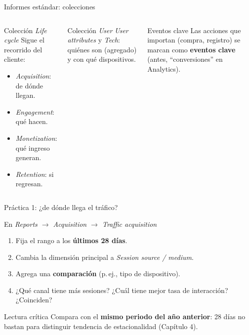 \documentclass[aspectratio=169,xcolor=dvipsnames]{beamer}
\begin{document}
\begin{frame}{Informes estándar: colecciones}
\begin{columns}[T]
  \begin{block}{Colección \textit{Life cycle}}
    \small Sigue el recorrido del cliente:
    \begin{itemize}
      \scriptsize
      \item \textit{Acquisition}: de dónde llegan.
      \item \textit{Engagement}: qué hacen.
      \item \textit{Monetization}: qué ingreso generan.
      \item \textit{Retention}: si regresan.
    \end{itemize}
  \end{block}
  \begin{block}{Colección \textit{User}}
    \small \textit{User attributes} y \textit{Tech}: quiénes son (agregado) y con qué dispositivos.
  \end{block}
  \begin{exampleblock}{Eventos clave}
    \scriptsize Las acciones que importan (compra, registro) se marcan como \textbf{eventos clave} (antes, \enquote{conversiones} en Analytics).
  \end{exampleblock}
\end{columns}
\end{frame}

\begin{frame}{Práctica 1: ¿de dónde llega el tráfico?}
\begin{block}{En \textit{Reports $\rightarrow$ Acquisition $\rightarrow$ Traffic acquisition}}
  \small
  \begin{enumerate}
    \item Fija el rango a los \textbf{últimos 28 días}.
    \item Cambia la dimensión principal a \textit{Session source / medium}.
    \item Agrega una \textbf{comparación} (p.\,ej., tipo de dispositivo).
    \item ¿Qué canal tiene más sesiones? ¿Cuál tiene mejor tasa de interacción? ¿Coinciden?
  \end{enumerate}
\end{block}
\begin{alertblock}{Lectura crítica}
  \small Compara con el \textbf{mismo periodo del año anterior}: 28 días no bastan para distinguir tendencia de estacionalidad (Capítulo 4).
\end{alertblock}
\end{frame}
\end{document}
